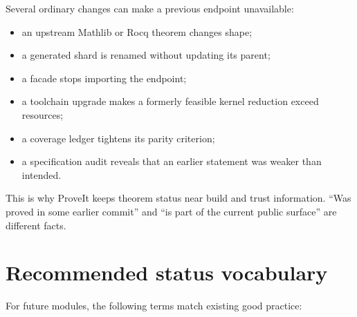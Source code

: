 \documentclass[
  10pt,
  a4paper,
  twoside,
  open=any,
  parskip=half,
  headings=big
]{scrreprt}
\begin{document}
Several ordinary changes can make a previous endpoint unavailable:

\begin{itemize}
  \item an upstream Mathlib or Rocq theorem changes shape;
  \item a generated shard is renamed without updating its parent;
  \item a facade stops importing the endpoint;
  \item a toolchain upgrade makes a formerly feasible kernel reduction exceed
        resources;
  \item a coverage ledger tightens its parity criterion;
  \item a specification audit reveals that an earlier statement was weaker
        than intended.
\end{itemize}

This is why ProveIt keeps theorem status near build and trust information.
``Was proved in some earlier commit'' and ``is part of the current public
surface'' are different facts.

\section{Recommended status vocabulary}

For future modules, the following terms match existing good practice:
\end{document}

